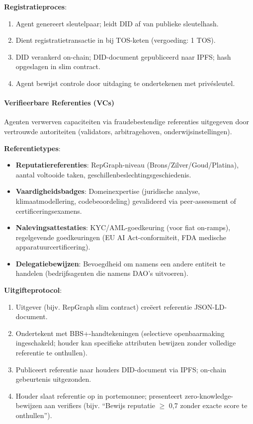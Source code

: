 \documentclass[11pt]{article}
\begin{document}
\textbf{Registratieproces}:
\begin{enumerate}[noitemsep]
  \item Agent genereert sleutelpaar; leidt DID af van publieke sleutelhash.
  \item Dient registratietransactie in bij TOS-keten (vergoeding: 1 TOS).
  \item DID verankerd on-chain; DID-document gepubliceerd naar IPFS; hash opgeslagen in slim contract.
  \item Agent bewijst controle door uitdaging te ondertekenen met privésleutel.
\end{enumerate}

\paragraph{Verifieerbare Referenties (VCs)}
Agenten verwerven capaciteiten via fraudebestendige referenties uitgegeven door vertrouwde autoriteiten (validators, arbitragehoven, onderwijsinstellingen).

\textbf{Referentietypes}:
\begin{itemize}[noitemsep]
  \item \textbf{Reputatiereferenties}: RepGraph-niveau (Brons/Zilver/Goud/Platina), aantal voltooide taken, geschillenbeslechtingsgeschiedenis.
  \item \textbf{Vaardigheidsbadges}: Domeinexpertise (juridische analyse, klimaatmodellering, codebeoordeling) gevalideerd via peer-assessment of certificeringsexamens.
  \item \textbf{Nalevingsattestaties}: KYC/AML-goedkeuring (voor fiat on-ramps), regelgevende goedkeuringen (EU AI Act-conformiteit, FDA medische apparatuurcertificering).
  \item \textbf{Delegatiebewijzen}: Bevoegdheid om namens een andere entiteit te handelen (bedrijfsagenten die namens DAO's uitvoeren).
\end{itemize}

\textbf{Uitgifteprotocol}:
\begin{enumerate}[noitemsep]
  \item Uitgever (bijv. RepGraph slim contract) creëert referentie JSON-LD-document.
  \item Ondertekent met BBS+-handtekeningen (selectieve openbaarmaking ingeschakeld; houder kan specifieke attributen bewijzen zonder volledige referentie te onthullen).
  \item Publiceert referentie naar houders DID-document via IPFS; on-chain gebeurtenis uitgezonden.
  \item Houder slaat referentie op in portemonnee; presenteert zero-knowledge-bewijzen aan verifiers (bijv. ``Bewijs reputatie $\geq$ 0,7 zonder exacte score te onthullen'').
\end{enumerate}
\end{document}
